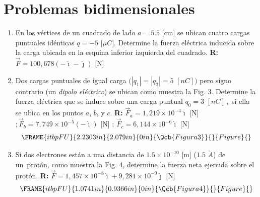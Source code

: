 \documentclass[12pt]{article}
\begin{document}
\section{Problemas bidimensionales}

\begin{enumerate}
\item En los v\'{e}rtices de un cuadrado de lado $a=5.5$ [cm] se ubican
cuatro cargas puntuales id\'{e}nticas $q=-5$ [$\mu C].$ Determine la fuerza
el\'{e}ctrica inducida sobre la carga ubicada en la esquina inferior
izquierda del cuadrado. \textbf{R: }$\vec{F}=100,678\left( -\hat{\imath}-%
\hat{\jmath}\right) $ [N]

\item Dos cargas puntuales de igual carga $(\left\vert q_{1}\right\vert
=\left\vert q_{2}\right\vert =5$ $[nC])$ pero signo contrario (un \textit{%
dipolo el\'{e}ctrico}) se ubican como muestra la Fig. 3. Determine la fuerza
el\'{e}ctrica que se induce sobre una carga puntual $q_{0}=3$ $[nC]\,,$ si
ella se ubica en los puntos $a$, $b$, y $c$. \textbf{R: }$\vec{F}%
_{a}=1,219\times 10^{-4}\hat{\imath}$ [N]$;\vec{F}_{b}=7,749\times
10^{-5}\left( -\hat{\imath}\right) $ [N] ; $\vec{F}_{c}=6,144\times 10^{-6}%
\hat{\imath}$ [N] 
\begin{equation*}
\FRAME{itbpFU}{2.2303in}{2.079in}{0in}{\Qcb{Figura 3}}{}{Figure}{\special%
{language "Scientific Word";type "GRAPHIC";maintain-aspect-ratio
TRUE;display "USEDEF";valid_file "T";width 2.2303in;height 2.079in;depth
0in;original-width 5.1534in;original-height 4.8066in;cropleft "0";croptop
"1";cropright "1";cropbottom "0";tempfilename
'QYQ9VJ03.wmf';tempfile-properties "XPR";}}
\end{equation*}

\item Si dos electrones est\'{a}n a una distancia de $1.5\times 10^{-10}$
[m] ($1.5$ $\mathring{A}$) de un\ prot\'{o}n, como muestra la Fig. 4,
determine la fuerza neta ejercida sobre el prot\'{o}n. \textbf{R: }$\vec{F}%
=1,457\times 10^{-8}\hat{\imath}+9,281\times 10^{-9}\hat{\jmath}$ [N]%
\begin{equation*}
\FRAME{itbpFU}{1.0741in}{0.9366in}{0in}{\Qcb{Figura 4}}{}{Figure}{\special%
{language "Scientific Word";type "GRAPHIC";maintain-aspect-ratio
TRUE;display "USEDEF";valid_file "T";width 1.0741in;height 0.9366in;depth
0in;original-width 2.0427in;original-height 1.7789in;cropleft "0";croptop
"1";cropright "1";cropbottom "0";tempfilename
'QYQ9VJ04.wmf';tempfile-properties "XPR";}}
\end{equation*}


\end{enumerate}
\end{document}
